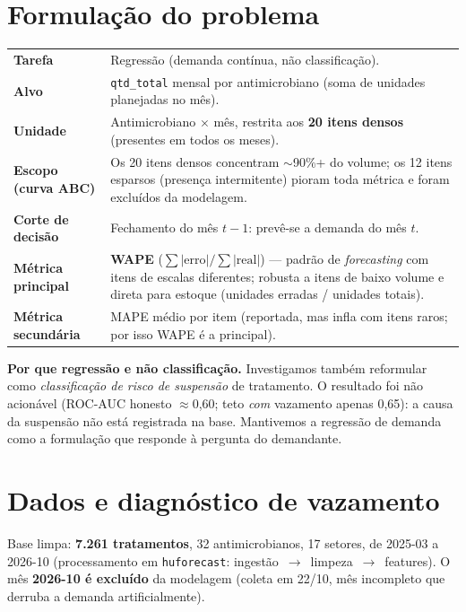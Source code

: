\documentclass[11pt,a4paper]{article}
\begin{document}
\section{Formulação do problema}
\begin{tabularx}{\textwidth}{@{}>{\bfseries}p{3.2cm} X@{}}
\toprule
Tarefa & Regressão (demanda contínua, não classificação). \\
Alvo & \texttt{qtd\_total} mensal por antimicrobiano (soma de unidades planejadas no mês). \\
Unidade & Antimicrobiano $\times$ mês, restrita aos \textbf{20 itens densos} (presentes em todos os meses). \\
Escopo (curva ABC) & Os 20 itens densos concentram $\sim$90\%+ do volume; os 12 itens esparsos (presença intermitente) pioram toda métrica e foram excluídos da modelagem. \\
Corte de decisão & Fechamento do mês $t-1$: prevê-se a demanda do mês $t$. \\
Métrica principal & \textbf{WAPE} ($\sum|\text{erro}| / \sum|\text{real}|$) --- padrão de \emph{forecasting} com itens de escalas diferentes; robusta a itens de baixo volume e direta para estoque (unidades erradas / unidades totais). \\
Métrica secundária & MAPE médio por item (reportada, mas infla com itens raros; por isso WAPE é a principal). \\
\bottomrule
\end{tabularx}

\noindent\textbf{Por que regressão e não classificação.} Investigamos também reformular como \emph{classificação de risco de suspensão} de tratamento. O resultado foi não acionável (ROC-AUC honesto $\approx$0,60; teto \emph{com} vazamento apenas 0,65): a causa da suspensão não está registrada na base. Mantivemos a regressão de demanda como a formulação que responde à pergunta do demandante.

\section{Dados e diagnóstico de vazamento}
Base limpa: \textbf{7.261 tratamentos}, 32 antimicrobianos, 17 setores, de 2025-03 a 2026-10 (processamento em \texttt{huforecast}: ingestão~$\to$~limpeza~$\to$~features). O mês \textbf{2026-10 é excluído} da modelagem (coleta em 22/10, mês incompleto que derruba a demanda artificialmente).
\end{document}
